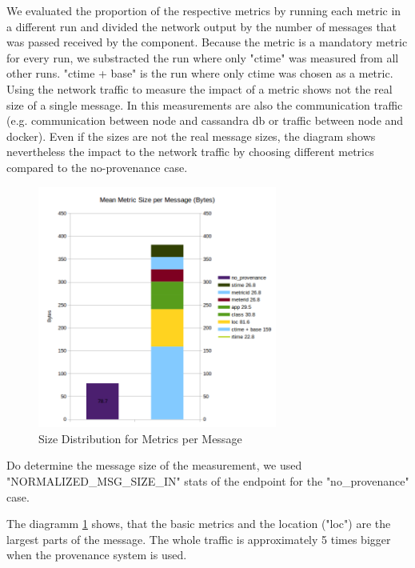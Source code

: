 We evaluated the proportion of the respective metrics by running each metric in a different run and divided the network output by the number of messages that was passed received by the component. Because the metric is a mandatory metric for every run, we substracted the run where only "ctime" was measured from all other runs. "ctime + base" is the run where only ctime was chosen as a metric. Using the network traffic to measure the impact of a metric shows not the real size of a single message. In this measurements are also the communication traffic (e.g. communication between node and cassandra db or traffic between node and docker). Even if the sizes are not the real message sizes, the diagram shows nevertheless the impact to the network traffic by choosing different metrics compared to the no-provenance case.

\begin{figure}[H]
	\center
	\includegraphics[width=0.7\textwidth]{figures/overheaddiagram1.png}
	\caption{Size Distribution for Metrics per Message}
	\label{fig:metricsdistribution}
\end{figure}


Do determine the message size of the measurement, we  used  "NORMALIZED\_MSG\_SIZE\_IN" stats of the endpoint for the "no\_provenance" case.

The diagramm \ref{fig:metricsdistribution} shows, that the basic metrics and the location ("loc") are the largest parts of the message. The whole traffic is approximately 5 times bigger when the provenance system is used.


